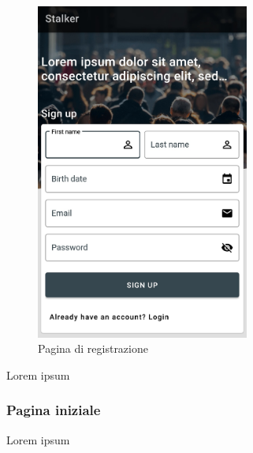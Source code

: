 \documentclass[../manuale-utente.tex]{subfiles}
\begin{document}
\begin{figure}[H]
    \centering
    \includegraphics[width=70mm]{img/mobile-app/pagina-di-registrazione.jpg}
    \caption{Pagina di registrazione}%
    \label{fig:mobile-app-pagina-di-registrazione}
\end{figure}

Lorem ipsum

\subsubsection{Pagina iniziale}%
\label{sub:pagina-iniziale}


Lorem ipsum

\end{document}
